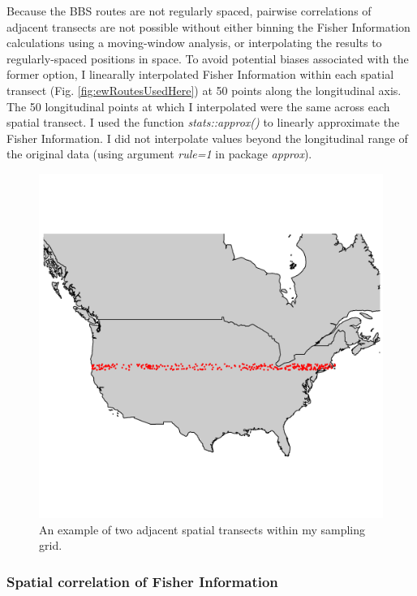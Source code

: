 \documentclass[12pt,twoside,openany]{reedthesis}
\begin{document}
Because the BBS routes are not regularly spaced, pairwise correlations of adjacent transects are not possible without either binning the Fisher Information calculations using a moving-window analysis, or interpolating the results to regularly-spaced positions in space. To avoid potential biases associated with the former option, I linearally interpolated Fisher Information within each spatial transect (Fig. \ref{fig:ewRoutesUsedHere}) at 50 points along the longitudinal axis. The 50 longitudinal points at which I interpolated were the same across each spatial transect. I used the function \emph{stats::approx()} to linearly approximate the Fisher Information. I did not interpolate values beyond the longitudinal range of the original data (using argument \emph{rule=1} in package \emph{approx}).
\begin{figure}[h]

{\centering \includegraphics[width=0.85\linewidth]{./chapterFiles/fisherSpatial/figures/figsCalledInDiss/transectSamplingEx_1row} 

}

\caption{An example of two adjacent spatial transects within my sampling grid.}\label{fig:oneTsectEx}
\end{figure}
\hypertarget{spatial-correlation-of-fisher-information}{%
\subsubsection{Spatial correlation of Fisher Information}\label{spatial-correlation-of-fisher-information}}
\end{document}
